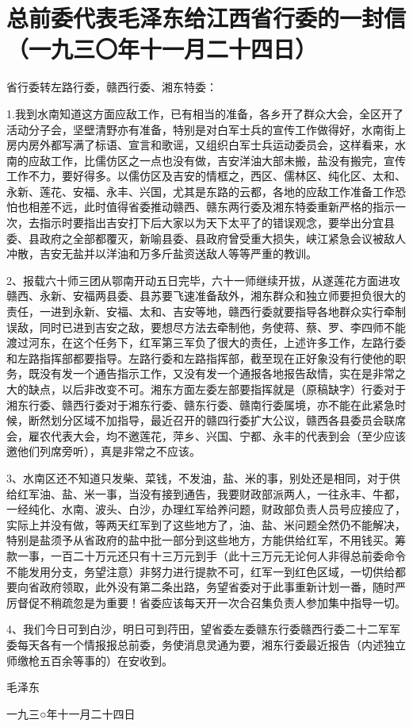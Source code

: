 \section[总前委代表毛泽东给江西省行委的一封信（一九三〇年十一月二十四日）]{总前委代表毛泽东给江西省行委的一封信（一九三〇年十一月二十四日）}


省行委转左路行委，赣西行委、湘东特委：

1.我到水南知道这方面应敌工作，已有相当的准备，各乡开了群众大会，全区开了活动分子会，坚壁清野亦有准备，特别是对白军士兵的宣传工作做得好，水南街上房内房外都写满了标语、宣言和歌谣，又组织白军士兵运动委员会，这样看来，水南的应敌工作，比儒仿区之一点也没有做，吉安洋油大部未搬，盐没有搬完，宣传工作不力，要好得多。以儒仿区及吉安的情框之，西区、儒林区、纯化区、太和、永新、莲花、安福、永丰、兴国，尤其是东路的云都，各地的应敌工作准备工作恐怕也相差不远，此时值得省委推动赣西、赣东两行委及湘东特委重新严格的指示一次，去指示时要指出吉安打下后大家以为天下太平了的错误观念，要举出分宜县委、县政府之全部都覆灭，新喻县委、县政府曾受重大损失，峡江紧急会议被敌人冲散，吉安无盐并以洋油和万多斤盐资送敌人等等严重的教训。

2、报载六十师三团从鄂南开动五日完毕，六十一师继续开拔，从遂莲花方面进攻赣西、永新、安福两县委、县苏要飞速准备敌外，湘东群众和独立师要担负很大的责任，一进到永新、安福、太和、吉安等地，赣西行委就要指导各地群众实行牵制误敌，同时已进到吉安之敌，要想尽方法去牵制他，务使蒋、蔡、罗、李四师不能渡过河东，在这个任务下，红军第三军负了很大的责任，上述许多工作，左路行委和左路指挥部都要指导。左路行委和左路指挥部，截至现在正好象没有行使他的职务，既没有发一个通告指示工作，又没有发一个通报各地报告敌情，实在是非常之大的缺点，以后非改变不可。湘东方面左委左部要指挥就是（原稿缺字）行委对于湘东行委、赣西行委对于湘东行委、赣东行委、赣南行委属境，亦不能在此紧急时候，断然划分区域不加指导，最近召开的赣四行委扩大公议，赣西各县委员会联席会，雇农代表大会，均不邀莲花，萍乡、兴国、宁都、永丰的代表到会（至少应该邀他们列席旁听），真是非常之不应该。

3、水南区还不知道只发柴、菜钱，不发油，盐、米的事，别处还是相同，对于供给红军油、盐、米一事，当没有接到通告，我要财政部派两人，一往永丰、牛都，一经纯化、水南、波头、白沙，办理红军给养问题，财政部负责人员号应接应了，实际上并没有做，等两天红军到了这些地方了，油、盐、米问题全然仍不能解决，特别是盐须予从省政府的盐中批一部分到这些地方，方能供给红军，不用钱买。筹款一事，一百二十万元还只有十三万元到手（此十三万元无论何人非得总前委命令不能发用分支，务望注意）非努力进行提款不可，红军一到红色区域，一切供给都要向省政府领取，此外没有第二条出路，务望省委对于此事重新计划一番，随时严厉督促不稍疏忽是为重要！省委应该每天开一次合召集负责人参加集中指导一切。

4、我们今日可到白沙，明日可到荇田，望省委左委赣东行委赣西行委二十二军军委每天各有一个情报报总前委，务使消息灵通为要，湘东行委最近报告（内述独立师缴枪五百余等事的）在安收到。

 毛泽东

 一九三○年十一月二十四日

